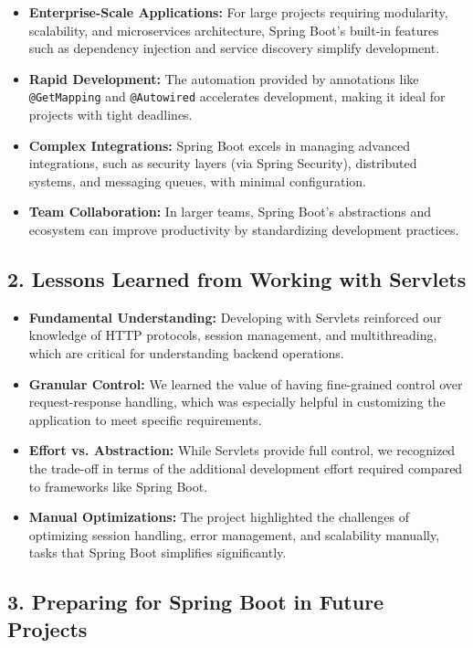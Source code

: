 \begin{itemize}
    \item \textbf{Enterprise-Scale Applications:} For large projects requiring modularity, scalability, and microservices architecture, Spring Boot's built-in features such as dependency injection and service discovery simplify development.
    \item \textbf{Rapid Development:} The automation provided by annotations like \texttt{@GetMapping} and \texttt{@Autowired} accelerates development, making it ideal for projects with tight deadlines.
    \item \textbf{Complex Integrations:} Spring Boot excels in managing advanced integrations, such as security layers (via Spring Security), distributed systems, and messaging queues, with minimal configuration.
    \item \textbf{Team Collaboration:} In larger teams, Spring Boot’s abstractions and ecosystem can improve productivity by standardizing development practices.
\end{itemize}

\subsection{2. Lessons Learned from Working with Servlets}

\begin{itemize}
    \item \textbf{Fundamental Understanding:} Developing with Servlets reinforced our knowledge of HTTP protocols, session management, and multithreading, which are critical for understanding backend operations.
    \item \textbf{Granular Control:} We learned the value of having fine-grained control over request-response handling, which was especially helpful in customizing the application to meet specific requirements.
    \item \textbf{Effort vs. Abstraction:} While Servlets provide full control, we recognized the trade-off in terms of the additional development effort required compared to frameworks like Spring Boot.
    \item \textbf{Manual Optimizations:} The project highlighted the challenges of optimizing session handling, error management, and scalability manually, tasks that Spring Boot simplifies significantly.
\end{itemize}

\subsection{3. Preparing for Spring Boot in Future Projects}

